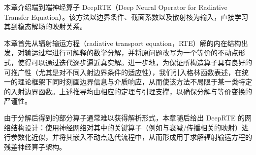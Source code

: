 
本章介绍端到端神经算子 DeepRTE（Deep Neural Operator for Radiative Transfer Equation）。该方法以边界条件、截面系数以及散射核为输入，直接学习其到稳态解场的映射关系。

本章首先从辐射输运方程（radiative transport equation，RTE）解的内在结构出发，对输运过程进行可解释的数学分解，并将原问题改写为一个等价的不动点形式，使得可以通过迭代逐步逼近真实解。进一步地，为保证所构造算子具有良好的可推广性（尤其是对不同入射边界条件的适应性），我们引入格林函数表述，在统一的理论框架下同时刻画边界信息与介质响应，从而使该方法不局限于某一类特定的入射边界函数。上述推导均由相应的定理与引理支撑，以确保分解与等价变换的严谨性。

由于分解后得到的部分算子通常难以获得解析形式，本章随后给出 DeepRTE 的网络结构设计：使用神经网络对其中的关键算子（例如与衰减/传播相关的映射）进行参数化近似，并将其嵌入不动点迭代流程中，从而形成用于求解辐射输运方程的残差神经算子架构。

